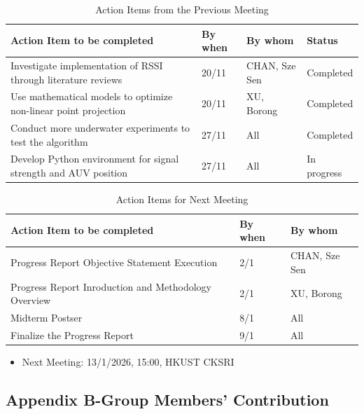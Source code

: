 \documentclass[11pt]{article}
\begin{document}
    \begin{longtable}[c]{|l|l|l|l|}
        \caption{Action Items from the Previous Meeting}\\
        \hline
        \textbf{Action Item to be completed} & \textbf{By when} & \textbf{By whom} & \textbf{Status} \\
        \hline
        \endhead
        Investigate implementation of RSSI through literature reviews & 20/11 & CHAN, Sze Sen & Completed\\
        \hline
        Use mathematical models to optimize non-linear point projection & 20/11 & XU, Borong & Completed\\
        \hline
        Conduct more underwater experiments to test the algorithm & 27/11 & All & Completed\\
        \hline
        Develop Python environment for signal strength and AUV position & 27/11 & All & In progress\\
        \hline
    \end{longtable}
    \begin{longtable}[c]{|l|l|l|}
        \caption{Action Items for Next Meeting}\\
        \hline
        \textbf{Action Item to be completed} & \textbf{By when} & \textbf{By whom} \\
        \hline
        \endhead
        Progress Report Objective Statement Execution & 2/1 & CHAN, Sze Sen \\
        \hline
        Progress Report Inroduction and Methodology Overview  & 2/1 & XU, Borong \\
        \hline
        Midterm Postser & 8/1 & All \\
        \hline
        Finalize the Progress Report & 9/1 & All \\
        \hline
    \end{longtable}
    \begin{itemize}
    \item Next Meeting: 13/1/2026, 15:00, HKUST CKSRI
    \end{itemize}
    \newpage
    \subsection*{Appendix B-Group Members’ Contribution}
\end{document}
